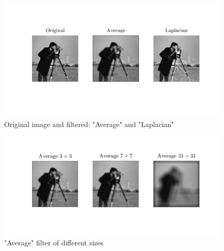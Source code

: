 \documentclass[oneside,a4paper]{article}
\begin{document}
\begin{figure}[ht!]
\centering
\includegraphics[width=130mm]{figures/Q1b.png}
\caption{Original image and filtered: "Average" and "Laplacian"}
\label{fig:Q1b}
\end{figure}

\begin{figure}[ht!]
\centering
\includegraphics[width=130mm]{figures/Q1a.png}
\caption{"Average" filter of different sizes}
\label{fig:Q1a}
\end{figure}

\newpage
\end{document}

